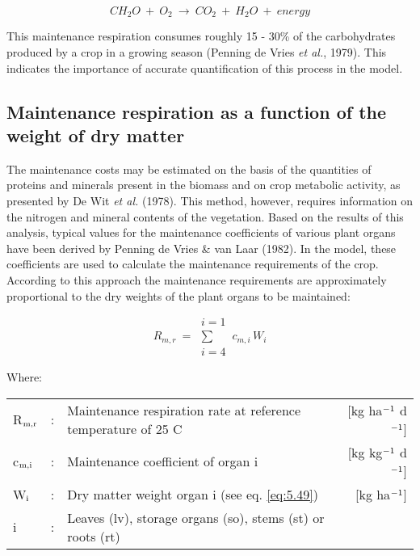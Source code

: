 \begin{equation}
CH _{2} O ~+~ O _{2} ~\longrightarrow~ CO _{2} ~+~ H _{2} O ~+~ energy
\end{equation}

This maintenance respiration consumes roughly 15 - 30\% of the carbohydrates produced
by a crop in a growing season (Penning de Vries {\it et al.}, 1979). This indicates the
importance of accurate quantification of this process in the model.

\subsection{Maintenance respiration as a function of the weight of dry matter}
The maintenance costs may be estimated on the basis of the quantities of proteins and
minerals present in the biomass and on crop metabolic activity, as presented by De Wit {\it et
	al.} (1978). This method, however, requires information on the nitrogen and mineral
contents of the vegetation.
Based on the results of this analysis, typical values for the maintenance coefficients of
various plant organs have been derived by Penning de Vries \& van Laar (1982).
In the model, these coefficients are used to calculate the maintenance requirements of the
crop. According to this approach the maintenance requirements are approximately 
proportional to the dry weights of the plant organs to be maintained: 

\begin{equation}
\label{eq:5.39}
R _{m,r} ~ = ~\begin{array}{c} {i=1}  \\
\sum  \\
{i=4}\end{array} \, c _{m,i} \, W _{i}
\end{equation}

Where:\\[5pt]
\begin{tabularx}{\textwidth}{llXr}
	R$_{{\rm m,r}}$ &:& Maintenance respiration rate at reference 
	temperature of 25 \degrees C &   [kg ha$^{{\rm -1}}$ d$^{{\rm -1}}$]\\
	c$_{{\rm m,i}}$ &:& Maintenance coefficient of organ i  & [kg kg$^{{\rm -1}}$ d$^{{\rm -1}}$]\\
	W$_{{\rm i}}$ &:& Dry matter weight organ i (see eq. \ref{eq:5.49})   &     [kg ha$^{{\rm -1}}$]\\
	i &:& Leaves (lv), storage organs (so), stems (st) or roots (rt)\\ 
\end{tabularx}

